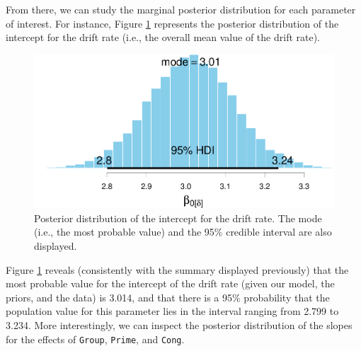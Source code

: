 \documentclass[
  11pt,
  english,
  ,doc,floatsintext]{apa6}
\newenvironment{Shaded}{}{}
\newcommand{\AttributeTok}[1]{\textcolor[rgb]{0.49,0.56,0.16}{#1}}
\newcommand{\CommentTok}[1]{\textcolor[rgb]{0.38,0.63,0.69}{\textit{#1}}}
\newcommand{\ConstantTok}[1]{\textcolor[rgb]{0.53,0.00,0.00}{#1}}
\newcommand{\DecValTok}[1]{\textcolor[rgb]{0.25,0.63,0.44}{#1}}
\newcommand{\FunctionTok}[1]{\textcolor[rgb]{0.02,0.16,0.49}{#1}}
\newcommand{\NormalTok}[1]{#1}
\newcommand{\OtherTok}[1]{\textcolor[rgb]{0.00,0.44,0.13}{#1}}
\newcommand{\SpecialCharTok}[1]{\textcolor[rgb]{0.25,0.44,0.63}{#1}}
\newcommand{\StringTok}[1]{\textcolor[rgb]{0.25,0.44,0.63}{#1}}
\begin{document}
From there, we can study the marginal posterior distribution for each parameter of interest. For instance, Figure \ref{fig:posterior-intercept-drift} represents the posterior distribution of the intercept for the drift rate (i.e., the overall mean value of the drift rate).

\begin{Shaded}
\end{Shaded}

\begin{figure}[!htb]

{\centering \includegraphics[width=0.75\linewidth]{supplementary_materials_files/figure-latex/posterior-intercept-drift-1} 

}

\caption{Posterior distribution of the intercept for the drift rate. The mode (i.e., the most probable value) and the 95\% credible interval are also displayed.}\label{fig:posterior-intercept-drift}
\end{figure}

Figure \ref{fig:posterior-intercept-drift} reveals (consistently with the summary displayed previously) that the most probable value for the intercept of the drift rate (given our model, the priors, and the data) is 3.014, and that there is a 95\% probability that the population value for this parameter lies in the interval ranging from 2.799 to 3.234. More interestingly, we can inspect the posterior distribution of the slopes for the effects of \texttt{Group}, \texttt{Prime}, and \texttt{Cong}.
\end{document}
